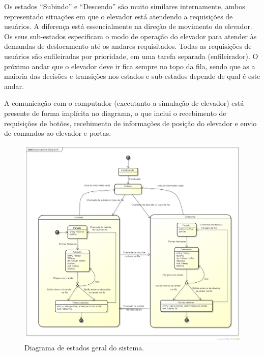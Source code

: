 Os estados ``Subindo'' e ``Descendo'' são muito similares internamente, ambos representado situações em que o elevador está atendendo a requisições de usuários. A diferença está essencialmente na direção de movimento do elevador. Os seus sub-estados especificam o modo de operação do elevador para atender às demandas de deslocamento até os andares requisitados. Todas as requisições de usuários são enfileiradas por prioridade, em uma tarefa separada (enfileirador). O próximo andar que o elevador deve ir fica sempre no topo da fila, sendo que as a maioria das decisões e transições nos estados e sub-estados depende de qual é este andar.

A comunicação com o computador (executanto a simulação de elevador) está presente de forma implícita no diagrama, o que inclui o recebimento de requisições de botões, recebimento de informações de posição do elevador e envio de comandos ao elevador e portas.

\begin{figure}[h]
    \centering
    \includegraphics[width=1\columnwidth]{./figures/maq_estados.png}
    \caption{Diagrama de estados geral do sistema.}
    \label{fig:maq_estados}
\end{figure}




